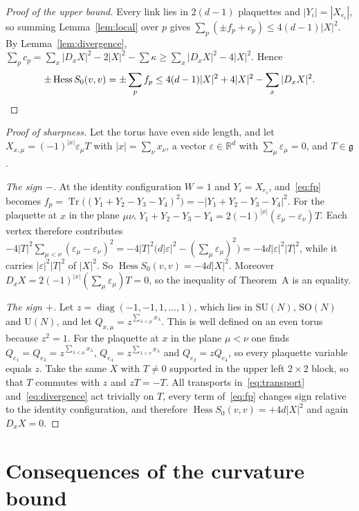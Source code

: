 \documentclass[11pt]{amsart}
\theoremstyle{definition}
\theoremstyle{remark}
\newcommand{\R}{\mathbb{R}}
\newcommand{\SU}{\mathrm{SU}}
\newcommand{\SO}{\mathrm{SO}}
\newcommand{\U}{\mathrm{U}}
\newcommand{\g}{\mathfrak{g}}
\newcommand{\Tr}{\operatorname{Tr}}
\newcommand{\Hess}{\operatorname{Hess}}
\begin{document}
\begin{proof}[Proof of the upper bound]
Every link lies in $2(d-1)$ plaquettes and $|Y_i|=|X_{e_i}|$, so summing
Lemma~\ref{lem:local} over $p$ gives $\sum_p(\pm f_p+c_p)\le4(d-1)|X|^2$. By
Lemma~\ref{lem:divergence},
$\sum_pc_p=\sum_x|D_xX|^2-2|X|^2-\sum\kappa\ge\sum_x|D_xX|^2-4|X|^2$. Hence
\[
\pm\Hess S_0(v,v)=\pm\sum_pf_p\le4(d-1)|X|^2+4|X|^2-\sum_x|D_xX|^2. \qedhere
\]
\end{proof}

\begin{proof}[Proof of sharpness]
Let the torus have even side length, and let $X_{x,\mu}=(-1)^{|x|}\varepsilon_\mu
T$ with $|x|=\sum_\nu x_\nu$, a vector $\varepsilon\in\R^d$ with
$\sum_\mu\varepsilon_\mu=0$, and $T\in\g$.

\emph{The sign $-$.} At the identity configuration $W=1$ and $Y_i=X_{e_i}$,
and~\eqref{eq:fp} becomes $f_p=\Tr\bigl((Y_1+Y_2-Y_3-Y_4)^2\bigr)
=-|Y_1+Y_2-Y_3-Y_4|^2$. For the plaquette at $x$ in the plane $\mu\nu$,
$Y_1+Y_2-Y_3-Y_4=2(-1)^{|x|}(\varepsilon_\mu-\varepsilon_\nu)T$. Each vertex
therefore contributes
$-4|T|^2\sum_{\mu<\nu}(\varepsilon_\mu-\varepsilon_\nu)^2
=-4|T|^2\bigl(d|\varepsilon|^2-(\textstyle\sum_\mu\varepsilon_\mu)^2\bigr)
=-4d|\varepsilon|^2|T|^2$, while it carries $|\varepsilon|^2|T|^2$ of $|X|^2$.
So $\Hess S_0(v,v)=-4d|X|^2$. Moreover $D_xX=2(-1)^{|x|}(\sum_\mu
\varepsilon_\mu)T=0$, so the inequality of Theorem~A is an equality.

\emph{The sign $+$.} Let $z=\operatorname{diag}(-1,-1,1,\dots,1)$, which lies in
$\SU(N)$, $\SO(N)$ and $\U(N)$, and let $Q_{x,\mu}=z^{\sum_{\lambda<\mu}x_\lambda}$.
This is well defined on an even torus because $z^2=1$. For the plaquette at
$x$ in the plane $\mu<\nu$ one finds $Q_{e_1}=Q_{e_3}=z^{\sum_{\lambda<\mu}
x_\lambda}$, $Q_{e_4}=z^{\sum_{\lambda<\nu}x_\lambda}$ and $Q_{e_2}=zQ_{e_4}$, so
every plaquette variable equals $z$. Take the same $X$ with $T\ne0$ supported in
the upper left $2\times2$ block, so that $T$ commutes with $z$ and $zT=-T$. All
transports in~\eqref{eq:transport} and~\eqref{eq:divergence} act trivially on
$T$, every term of~\eqref{eq:fp} changes sign relative to the identity
configuration, and therefore $\Hess S_0(v,v)=+4d|X|^2$ and again $D_xX=0$.
\end{proof}

\section{Consequences of the curvature bound}\label{sec:be}
\end{document}
